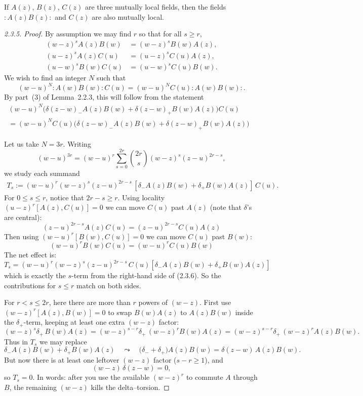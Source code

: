 \documentclass[12pt]{article}
\begin{document}
\begin{lemma}
    If $A(z)$, $B(z)$, $C(z)$ are three mutually local fields,
    then the fields $:A(z)B(z):$ and $C(z)$ are also mutually local.
\end{lemma}

\begin{proof}[2.3.5. Proof]
    By assumption we may find $r$ so that for all $s\ge r$,
    \[
        \begin{aligned}
            (w-z)^s A(z)B(w) & = (w-z)^s B(w)A(z), \\
            (u-z)^s A(z)C(u) & = (u-z)^s C(u)A(z), \\
            (u-w)^s B(w)C(u) & = (u-w)^s C(u)B(w).
        \end{aligned}
    \]
    We wish to find an integer $N$ such that
    \[
        (w-u)^N :A(w)B(w):C(u)
        = (w-u)^N C(u):A(w)B(w):.
    \]
    By part~(3) of Lemma~2.2.3, this will follow from the statement
    \begin{equation}\label{2.3.6}
        \begin{aligned}
            (w-u)^N \big( \delta(z-w)_- A(z)B(w) + \delta(z-w)_+ B(w)A(z) \big) C(u)
             & \\
            = (w-u)^N C(u) \big( \delta(z-w)_- A(z)B(w) + \delta(z-w)_+ B(w)A(z) \big)
        \end{aligned}
    \end{equation}

    Let us take $N = 3r$. Writing
    \[
        (w-u)^{3r} = (w-u)^r \sum_{s=0}^{2r} \binom{2r}{s} (w-z)^s (z-u)^{2r-s},
    \]
    we study each summand \begin{align*}
        T_s:=(w-u)^r (w-z)^s (z-u)^{2r-s}\,[\delta_-A(z)B(w)+\delta_+B(w)A(z)]\,C(u).
    \end{align*}
    For $0\le s\le r$, notice that $2r-s\ge r$. Using locality $(u-z)^r[A(z),C(u)]=0$ we can move $C(u)$ past $A(z)$ (note that $\delta$'s are central):
    \[(z-u)^{2r-s}A(z)C(u)=(z-u)^{2r-s}C(u)A(z)\]
    Then using $(w-u)^r[B(w),C(u)]=0$ we can move $C(u)$ past $B(w)$:
    \[(w-u)^r B(w)C(u)=(w-u)^r C(u)B(w)\]
    The net effect is:
    \[T_s=(w-u)^r (w-z)^s (z-u)^{2r-s}\,C(u)[\delta_-A(z)B(w)+\delta_+B(w)A(z)]\]
    which is exactly the $s$-term from the right-hand side of (2.3.6). So the contributions for $s\le r$ match on both sides.

    For $r<s\le 2r$, here there are more than $r$ powers of $(w-z)$. First use $(w-z)^r[A(z),B(w)]=0$ to swap $B(w)A(z)$ to $A(z)B(w)$ inside the $\delta_+$-term, keeping at least one extra $(w-z)$ factor:
    \[(w-z)^s\delta_+\,B(w)A(z)=(w-z)^{s-r}\delta_+\,(w-z)^r B(w)A(z)
        =(w-z)^{s-r}\delta_+\, (w-z)^r A(z)B(w).
    \]
    Thus in $T_s$ we may replace
    \[\delta_-A(z)B(w)+\delta_+B(w)A(z)
        \quad\leadsto\quad
        \big(\delta_-+\delta_+\big)A(z)B(w)=\delta(z-w)\,A(z)B(w).
    \]
    But now there is at least one leftover $(w-z)$ factor ($s-r\ge 1$), and
    \[(w-z)\,\delta(z-w)=0,
    \]
    so $T_s=0$. In words: after you use the available $(w-z)^r$ to commute $A$ through $B$, the remaining $(w-z)$ kills the delta–torsion.


\end{proof}
\end{document}
